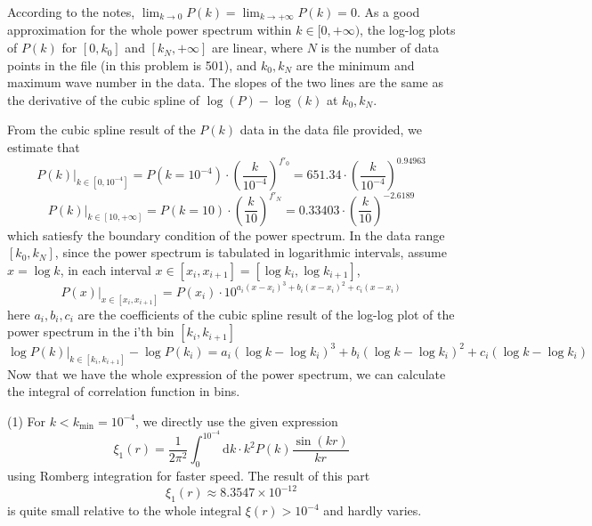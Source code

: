 \documentclass[12pt, graphicx]{article}
\begin{document}
According to the notes, $\displaystyle\lim_{k\to0}P(k)=\lim_{k\to+\infty}P(k)=0$. As a good approximation for the whole power spectrum within $k\in[0,+\infty)$, the log-log plots of $P(k)$ for $[0,k_0]$ and $[k_N, +\infty]$ are linear, where $N$ is the number of data points in the file (in this problem is 501), and $k_0,k_N$ are the minimum and maximum wave number in the data. The slopes of the two lines are the same as the derivative of the cubic spline of $\log(P)-\log(k)$ at $k_0,k_N$. \par

From the cubic spline result of the $P(k)$ data in the data file provided, we estimate that 
\begin{equation}
P(k)|_{k\in[0,10^{-4}]}=P(k=10^{-4})\cdot(\frac{k}{10^{-4}})^{f'_0}=651.34\cdot(\frac{k}{10^{-4}})^{0.94963}
\end{equation}
\begin{equation}
P(k)|_{k\in[10,+\infty]}=P(k=10)\cdot(\frac{k}{10})^{f'_N}=0.33403\cdot(\frac{k}{10})^{-2.6189}
\end{equation}
which satiesfy the boundary condition of the power spectrum. In the data range $[k_0,k_N]$, since the power spectrum is tabulated in logarithmic intervals, assume $x=\log k$, in each interval $x\in[x_i, x_{i+1}]=[\log k_i,\log k_{i+1}]$, 
\begin{equation}
P(x)|_{x\in[x_i,x_{i+1}]}=P(x_i)\cdot10^{a_i(x-x_i)^3+b_i(x-x_i)^2+c_i(x-x_i)}
\end{equation}
here $a_i,b_i,c_i$ are the coefficients of the cubic spline result of the log-log plot of the power spectrum in the i'th bin $[k_i,k_{i+1}]$
\begin{equation}
\log P(k)|_{k\in[k_i,k_{i+1}]}-\log P(k_i)=a_i(\log k-\log k_i)^3+b_i(\log k-\log k_i)^2+c_i(\log k-\log k_i)
\end{equation}
Now that we have the whole expression of the power spectrum, we can calculate the integral of correlation function in bins.\par 

(1) For $k<k_\mathrm{min}=10^{-4}$, we directly use the given expression 
\begin{equation}
\xi_1(r)=\frac{1}{2\pi^2}\int_0^{10^{-4}}\mathrm{d}k\cdot k^2P(k)\frac{\sin(kr)}{kr}
\end{equation}
using Romberg integration for faster speed. The result of this part
\begin{equation}
\xi_1(r)\approx 8.3547\times 10^{-12}
\end{equation}
is quite small relative to the whole integral $\xi(r)>10^{-4}$ and hardly varies. \par
\end{document}
